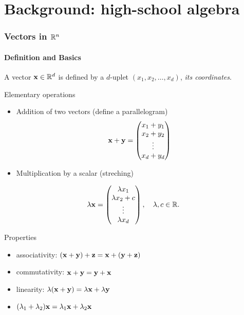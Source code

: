 \section{Background: high-school algebra}

\begin{frame}
  \frametitle{Vectors in $\mathbb{R}^n$}
  \framesubtitle{Definition and Basics}

   A vector $\mathbf{x}\in\mathbb{R}^d$ is defined by a $d$-uplet $(x_1, x_2, \dots, x_d)$, \textit{its coordinates}.

  \begin{block}{Elementary operations}
  \vspace{-.5cm}
  \begin{multicols}{2}
   \begin{itemize}
    \item Addition of two vectors (define a parallelogram)
    \begin{equation*}
    \mathbf{x} + \mathbf{y} = \begin{pmatrix}
    x_1 + y_1 \\ x_2 + y_2 \\ \vdots \\ x_d + y_d
    \end{pmatrix}
  \end{equation*}
    \item Multiplication by a scalar (streching)
   \end{itemize}
  \begin{equation*}
    \lambda \mathbf{x} = \begin{pmatrix}
    \lambda x_1 \\ \lambda x_2 + c \\ \vdots \\ \lambda x_d
    \end{pmatrix}, \quad \lambda, c \in \mathbb{R}.
  \end{equation*}
  \end{multicols}
  \end{block}

  \begin{block}{Properties}
  \vspace{-.5cm}
  \begin{multicols}{2}
    \begin{itemize}
      \item associativity: $(\mathbf{x} + \mathbf{y}) + \mathbf{z} = \mathbf{x} + (\mathbf{y} + \mathbf{z})$
      \item commutativity: $\mathbf{x} + \mathbf{y} = \mathbf{y} + \mathbf{x}$
      \item linearity: $\lambda (\mathbf{x} + \mathbf{y}) = \lambda \mathbf{x} + \lambda \mathbf{y}$
      \item $(\lambda_1 + \lambda_2) \mathbf{x} = \lambda_1\mathbf{x} + \lambda_2 \mathbf{x}$
    \end{itemize}  
  \end{multicols}
  \end{block}
  
\end{frame}


